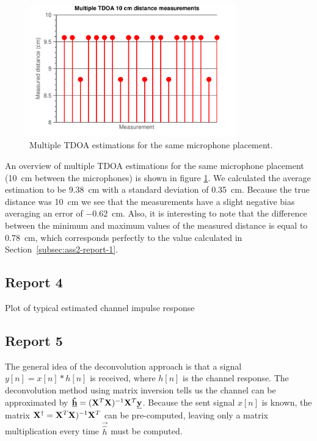 \documentclass[11pt,titlepage]{report}
\begin{document}
\begin{figure}[H]
	\centering
	\includegraphics[width=0.8\textwidth]{../../deliverable-7-resources/figures/ass-2/report-2-3/ass-2-report-3.pdf}
	\caption{Multiple TDOA estimations for the same microphone placement.}
	\label{fig:ass-2-rep-3}
\end{figure}

An overview of multiple TDOA estimations for the same microphone placement (\SI{10}{\centi\meter} between the microphones) is shown in figure \ref{fig:ass-2-rep-3}. We calculated the average estimation to be \SI{9.38}{\centi\meter} with a standard deviation of \SI{0.35}{\centi\meter}. Because the true distance was \SI{10}{\centi\meter} we see that the measurements have a slight negative bias averaging an error of \SI{-0.62}{\centi\meter}. Also, it is interesting to note that the difference between the minimum and maximum values of the measured distance is equal to \SI{0.78}{cm}, which corresponds perfectly to the value calculated in Section~\ref{subsec:ass2-report-1}.

\subsection{Report 4}
\label{subsec:ass2-report-4}
Plot of typical estimated channel impulse response

\subsection{Report 5}
The general idea of the deconvolution approach is that a signal $y[n]=x[n]*h[n]$ is received, where $h[n]$ is the channel response. The deconvolution method using matrix inversion tells us the channel can be approximated by $\mathbf{\underline{\hat{h}}}=(\mathbf{X}^T\mathbf{X})^{-1}\mathbf{X}^T\mathbf{\underline{y}}$. Because the sent signal $x[n]$ is known, the matrix $\mathbf{X}^\dagger=\mathbf{X}^T\mathbf{X})^{-1}\mathbf{X}^T$ can be pre-computed, leaving only a matrix multiplication every time $\vec{\hat{h}}$ must be computed. 
\end{document}
